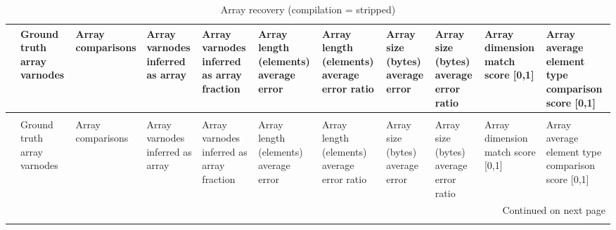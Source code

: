 \begin{longtable}{lp{1.8cm}p{1.8cm}p{1.8cm}p{1.8cm}p{1.8cm}p{1.8cm}p{1.8cm}p{1.8cm}p{1.8cm}p{1.8cm}}
\caption{Array recovery (compilation = stripped)}
\label{table:array-comparisons-O0-strip}\\
\toprule
{} &  Ground truth array varnodes &  Array comparisons &  Array varnodes inferred as array &  Array varnodes inferred as array fraction &  Array length (elements) average error &  Array length (elements) average error ratio &  Array size (bytes) average error &  Array size (bytes) average error ratio &  Array dimension match score [0,1] &  Array average element type comparison score [0,1] \\
\midrule
\endfirsthead
\caption[]{Array recovery (compilation = stripped)} \\
\toprule
{} &  Ground truth array varnodes &  Array comparisons &  Array varnodes inferred as array &  Array varnodes inferred as array fraction &  Array length (elements) average error &  Array length (elements) average error ratio &  Array size (bytes) average error &  Array size (bytes) average error ratio &  Array dimension match score [0,1] &  Array average element type comparison score [0,1] \\
\midrule
\endhead
\midrule
\multicolumn{11}{r}{{Continued on next page}} \\
\midrule
\endfoot


\end{longtable}
